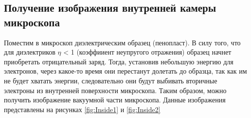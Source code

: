 \documentclass[a4paper,12pt]{article}
\begin{document}
\subsection{Получение изображения внутренней камеры микроскопа}

Поместим в микроскоп диэлектрическим образец (пенопласт). В силу того, что для диэлектриков $\eta$ < 1 (коэффииент неупругого отражения) образец начнет приобретать отрицательный заряд. Тогда, установив небольшую энергию для электронов, через какое-то время они перестанут долетать до образца, так как им не будет хватать энергии, следовательно они будут выбивать вторичные электроны из внутренней поверхности микроскопа. Таким образом, можно получить изображение вакуумной части микроскопа. Данные изображения представлены на рисунках \ref{fig:Inside1} и \ref{fig:Inside2}
\end{document}
